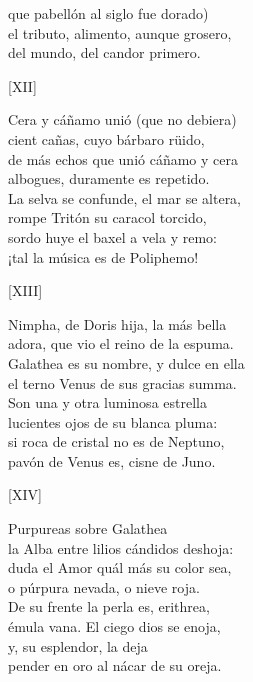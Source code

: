 \documentclass[11pt,a4paper,twoside]{article}
\begin{document}
que pabellón al siglo fue dorado)\\
el tributo, alimento, aunque grosero,\\
del  mundo, del candor primero.\par\pend
\relax
\vfill
\newpage
%
\begin{center}
	[XII]
\end{center}\pstart
Cera y cáñamo unió (que no debiera)\\
cient cañas, cuyo bárbaro rüido,\\
de más echos que unió cáñamo y cera\\
albogues, duramente es repetido.\\
La selva se confunde, el mar se altera,\\
rompe Tritón su caracol torcido,\\
sordo huye el baxel a vela y remo:\\
¡tal la música es de Poliphemo!\par\pend
%
\begin{center}
	[XIII]
\end{center}\pstart
Nimpha, de Doris hija, la más bella\\
adora, que vio el reino de la espuma.\\
Galathea es su nombre, y dulce en ella\\
el terno Venus de sus gracias summa.\\
Son una y otra luminosa estrella\\
lucientes ojos de su blanca pluma:\\
si roca de cristal no es de Neptuno,\\
pavón de Venus es, cisne de Juno.\par\pend 
%
\begin{center}
	[XIV]
\end{center}\pstart
Purpureas  sobre Galathea\\
la Alba entre lilios cándidos deshoja:\\
duda el Amor quál más su color sea,\\
o púrpura nevada, o nieve roja.\\
De su frente la perla es, erithrea,\\
émula vana. El ciego dios se enoja,\\
y,  su esplendor, la deja\\
pender en oro al nácar de su oreja.\par\pend
\end{document}
